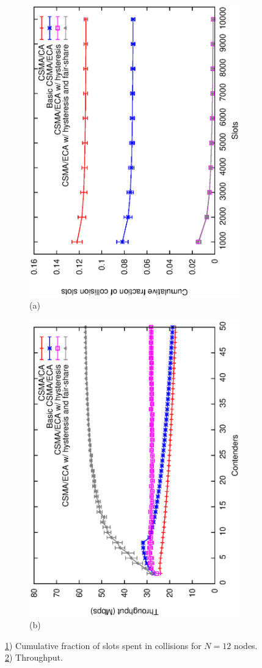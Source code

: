 \begin{figure}[htbp]
\centering
\begin{subfigure}{.5\textwidth}
  \centering
  \includegraphics[width=0.7\linewidth,angle=-90]{avgCollisions-12sta.eps}
  \caption{(a)}
  \label{fig:avgCollisions}
\end{subfigure}%
\begin{subfigure}{.5\textwidth}
  \centering
  \includegraphics[width=0.7\linewidth,angle=-90]{throughput-combined.eps}
  \caption{(b)}
  \label{fig:throughputCombined}
\end{subfigure}
\caption{\ref{fig:avgCollisions}) Cumulative fraction of slots spent in collisions for $N=12$ nodes. \ref{fig:throughputCombined}) Throughput.}
\label{fig:ICCPaper}
\end{figure}

